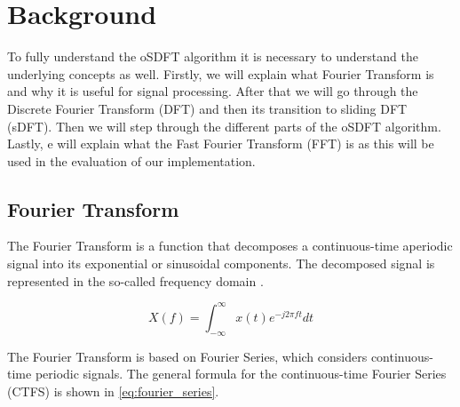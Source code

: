 \documentclass[../main.tex]{subfiles}
\begin{document}
\section{Background}%
\label{sec:background}

To fully understand the oSDFT algorithm it is necessary to understand the underlying concepts as well. 
Firstly, we will explain what Fourier Transform is and why it is useful for signal processing.
After that we will go through the Discrete Fourier Transform (DFT) and then its transition to sliding DFT (sDFT).
Then we will step through the different parts of the oSDFT algorithm.
Lastly, e will explain what the Fast Fourier Transform (FFT) is as this will be used in the evaluation of our implementation.





\subsection{Fourier Transform}%
\label{sub:fourier_transform}

The Fourier Transform is a function that decomposes a continuous-time aperiodic signal into its exponential or sinusoidal components.
The decomposed signal is represented in the so-called frequency domain \cite{digital_signal_processing}.

\begin{equation}
    \label{eq:fourier_transform}
    X(f) = \int_{-\infty}^{\infty} x(t) e^{-j 2 \pi f t} dt 
\end{equation}

The Fourier Transform is based on Fourier Series, which considers continuous-time periodic signals.
The general formula for the continuous-time Fourier Series (CTFS) is shown in \eqref{eq:fourier_series}.
\end{document}
